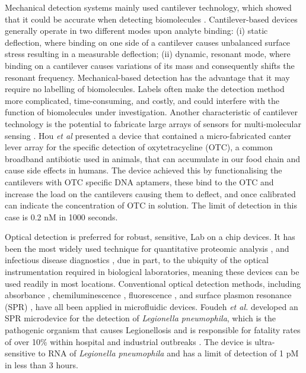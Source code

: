 Mechanical detection systems mainly used cantilever technology, which showed that it could be accurate
when detecting biomolecules \citep{waggoner2007micro}. Cantilever-based devices generally operate in two
different modes upon analyte binding: (i) static deflection, where binding on one side of a cantilever
causes unbalanced surface stress resulting in a measurable deflection; (ii) dynamic, resonant mode, where
binding on a cantilever causes variations of its mass and consequently shifts the resonant frequency.
Mechanical-based detection has the advantage that it may require no labelling of biomolecules. Labels often make the detection
method more complicated, time-consuming, and costly, and could interfere with the function of biomolecules
under investigation. Another characteristic of cantilever technology is the potential to fabricate large
arrays of sensors for multi-molecular sensing \citep{ferrari2005cancer}. Hou \textit{et al} \citep{hou2013aptamer} presented
a device that contained a micro-fabricated canter lever array for the  specific detection of
oxytetracycline (OTC), a common broadband antibiotic used in animals, that can accumulate in our food chain
and cause side effects in humans. The device achieved this by functionalising the cantilevers with OTC
specific DNA aptamers, these bind to the OTC and increase the load on the cantilevers causing them
to deflect, and once calibrated can indicate the concentration of OTC in solution. The limit of detection
in this case is 0.2 nM in 1000 seconds.

Optical detection is preferred for robust, sensitive, Lab on a chip devices. It has been the most widely
used technique for quantitative proteomic analysis \citep{rusling2010measurement}, and infectious disease
diagnostics \citep{foudeh2012microfluidic}, due in part, to the ubiquity of the optical instrumentation
required in biological laboratories, meaning these devices can be used readily in most locations.
Conventional optical detection methods, including absorbance \citep{wang2011integration},
chemiluminescence \citep{wojciechowski2009organic}, fluorescence \citep{yildirim2012aptamer}, and surface
plasmon resonance (SPR) \citep{foudeh2014sub}, have all been applied in microfluidic devices. Foudeh
\textit{et al.} \citep{foudeh2014sub} developed an SPR microdevice for the detection of
\textit{Legionella pneumophila}, which is the pathogenic organism that causes Legionellosis and
is responsible for fatality rates of over 10\% within hospital and industrial outbreaks
\citep{swanson2000legionella}. The device is ultra-sensitive to RNA of \textit{Legionella pneumophila}
and has a limit of detection of 1 pM in less than 3 hours.

